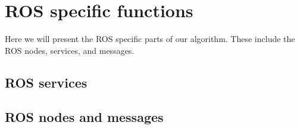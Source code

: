 \section{ROS specific functions}
    Here we will present the ROS specific parts of our algorithm. These include the ROS nodes, services, and messages.

    \subsection{ROS services}

    \subsection{ROS nodes and messages}
    